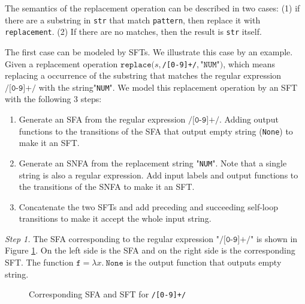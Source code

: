 \documentclass[a4paper,UKenglish,cleveref, autoref, anonymous, thm-restate]{lipics-v2021}
\begin{document}
The semantics of the replacement operation can be described in two cases: (1) if there are a substring in \texttt{str} that match \texttt{pattern}, then replace it with \texttt{replacement}. (2) If there are no matches, then the result is \texttt{str} itself.

The first case can be modeled by SFTs. We illustrate this case by an example. Given a replacement operation $\texttt{replace}(s, $\texttt{/[0-9]+/}$, $"$\texttt{NUM}$"$)$, which means replacing a occurrence of the substring that matches the regular expression $\texttt{/[0-9]+/}$ with the string"\texttt{NUM}".
We model this replacement operation by an SFT with the following 3 steps:

\begin{enumerate}
  \item Generate an SFA from the regular expression $\texttt{/[0-9]+/}$. Adding output functions to the transitions of the SFA that output empty string (\texttt{None}) to make it an SFT.
  \item Generate an SNFA from the replacement string "\texttt{NUM}". Note that a single string is also a regular expression. Add input labels and output functions to the transitions of the SNFA to make it an SFT.
  \item Concatenate the two SFTs and add preceding and succeeding self-loop transitions to make it accept the whole input string.
\end{enumerate}


\noindent\emph{Step 1.}
The SFA corresponding to the regular expression "$\texttt{/[0-9]+/}$" is shown in Figure \ref{fig-snfa-pattern}. On the left side is the SFA and on the right side is the corresponding SFT. The function $\texttt{f} = \lambda x.~\texttt{None}$ is the output function that outputs empty string. 





\begin{figure}[h] \centering
{}
\caption{Corresponding SFA and SFT for \texttt{/[0-9]+/}}
\label{fig-snfa-pattern}
\end{figure}
\end{document}
